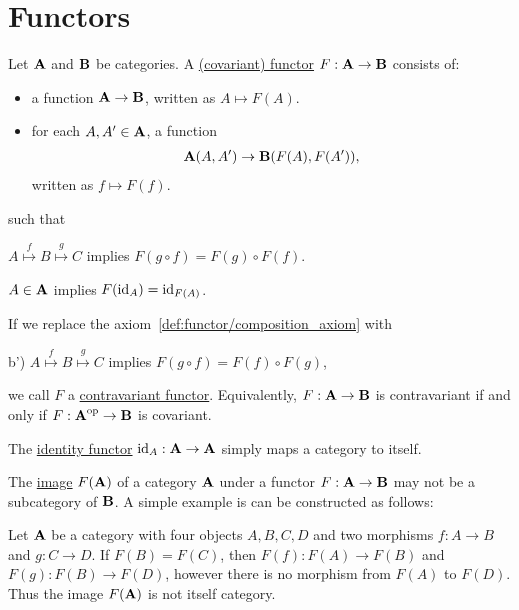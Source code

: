 \section{Functors}\label{sec:functors}

\begin{definition}\label{def:functor}\cite[definitions 1.2.1, 1.2.10]{Leinster2014}
  Let $\operatorname{\mathbf{A}}$ and $\operatorname{\mathbf{B}}$ be categories. A \ul{(covariant) functor} $F: \operatorname{\mathbf{A}} \to \operatorname{\mathbf{B}}$ consists of:
  \begin{itemize}
    \item a function $\operatorname{\mathbf{A}} \to \operatorname{\mathbf{B}}$, written as $A \mapsto F(A)$.
    \item for each $A, A' \in \operatorname{\mathbf{A}}$, a function
    \begin{align*}
      \operatorname{\mathbf{A}}(A, A') \to \operatorname{\mathbf{B}}(F(A), F(A')),
    \end{align*}
    written as $f \mapsto F(f)$.
  \end{itemize}
  such that
  \begin{defenum}
    \item\label{def:functor/composition_axiom} $A \overset f \mapsto B \overset g \mapsto C$ implies $F(g \circ f) = F(g) \circ F(f)$.
    \item\label{def:functor/identity_axiom} $A \in \operatorname{\mathbf{A}}$ implies $F(\operatorname{id}_A) = \operatorname{id}_{F(A)}$.
  \end{defenum}

  If we replace the axiom~\cref{def:functor/composition_axiom} with
  \begin{defenum}
    \item[b')]\label{def:functor/contravariant_composition_axiom} $A \overset f \mapsto B \overset g \mapsto C$ implies $F(g \circ f) = F(f) \circ F(g)$,
  \end{defenum}
  we call $F$ a \ul{contravariant functor}. Equivalently, $F: \operatorname{\mathbf{A}} \to \operatorname{\mathbf{B}}$ is contravariant if and only if $F: \operatorname{\mathbf{A}}^{\operatorname{op}} \to \operatorname{\mathbf{B}}$ is covariant.

  The \ul{identity functor} $\operatorname{id}_A: \operatorname{\mathbf{A}} \to \operatorname{\mathbf{A}}$ simply maps a category to itself.
\end{definition}

\begin{note}\label{note:image_of_functor_maybe_not_subcategory}
  The \ul{image} $F(\operatorname{\mathbf{A}})$ of a category $\operatorname{\mathbf{A}}$ under a functor $F: \operatorname{\mathbf{A}} \to \operatorname{\mathbf{B}}$ may not be a subcategory of $\operatorname{\mathbf{B}}$. A simple example is can be constructed as follows:

  Let $\operatorname{\mathbf{A}}$ be a category with four objects $A, B, C, D$ and two morphisms $f: A \to B$ and $g: C \to D$. If $F(B) = F(C)$, then $F(f): F(A) \to F(B)$ and $F(g): F(B) \to F(D)$, however there is no morphism from $F(A)$ to $F(D)$. Thus the image $F(\operatorname{\mathbf{A}})$ is not itself category.
\end{note}

